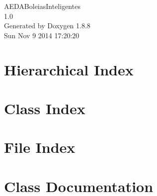 \documentclass[twoside]{book}
\newcommand{\+}{\discretionary{\mbox{\scriptsize$\hookleftarrow$}}{}{}}
\newcommand{\clearemptydoublepage}{%
  \newpage{\pagestyle{empty}\cleardoublepage}%
}
\begin{document}
\hypersetup{pageanchor=false,
             bookmarks=true,
             bookmarksnumbered=true,
             pdfencoding=unicode
            }
\begin{titlepage}
\vspace*{7cm}
\begin{center}%
{\Large A\+E\+D\+A\+Boleias\+Inteligentes \\[1ex]\large 1.\+0 }\\
\vspace*{1cm}
{\large Generated by Doxygen 1.8.8}\\
\vspace*{0.5cm}
{\small Sun Nov 9 2014 17:20:20}\\
\end{center}
\end{titlepage}
\clearemptydoublepage
\tableofcontents
\clearemptydoublepage
{}
\hypersetup{pageanchor=true}

\chapter{Hierarchical Index}

\chapter{Class Index}

\chapter{File Index}

\chapter{Class Documentation}


























\end{document}
